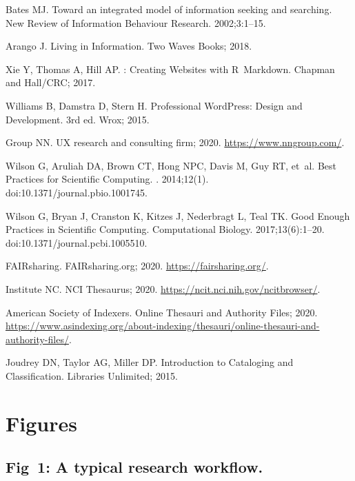 \documentclass[10pt,letterpaper]{article}
\begin{document}
\begin{thebibliography}{10}
Bates MJ.
\newblock Toward an integrated model of information seeking and searching.
\newblock New Review of Information Behaviour Research. 2002;3:1--15.

Arango J.
\newblock Living in Information.
\newblock Two Waves Books; 2018.

Xie Y, Thomas A, Hill AP.
: Creating Websites with R~Markdown.
\newblock Chapman and Hall/CRC; 2017.

Williams B, Damstra D, Stern H.
\newblock Professional WordPress: Design and Development.
\newblock 3rd ed. Wrox; 2015.

Group NN. UX research and consulting firm; 2020.
\newblock \url{https://www.nngroup.com/}.

Wilson G, Aruliah DA, Brown CT, Hong NPC, Davis M, Guy RT, et~al.
\newblock Best Practices for Scientific Computing.
. 2014;12(1).
\newblock doi:{10.1371/journal.pbio.1001745}.

Wilson G, Bryan J, Cranston K, Kitzes J, Nederbragt L, Teal TK.
\newblock Good Enough Practices in Scientific Computing.
 Computational Biology. 2017;13(6):1--20.
\newblock doi:{10.1371/journal.pcbi.1005510}.

FAIRsharing. FAIRsharing.org; 2020.
\newblock \url{https://fairsharing.org/}.

Institute NC. {NCI} Thesaurus; 2020.
\newblock \url{https://ncit.nci.nih.gov/ncitbrowser/}.

{American Society of Indexers}. Online Thesauri and Authority Files; 2020.
\newblock
  \url{https://www.asindexing.org/about-indexing/thesauri/online-thesauri-and-authority-files/}.

Joudrey DN, Taylor AG, Miller DP.
\newblock Introduction to Cataloging and Classification.
\newblock Libraries Unlimited; 2015.

\end{thebibliography}

\section*{Figures}

\subsection*{Fig~1: A typical research workflow.}
\end{document}
